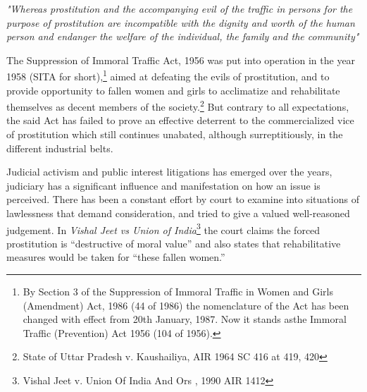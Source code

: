 \begin{multicols}{2}
\noi
\textit{"Whereas prostitution and the accompanying evil of the traffic in persons for the purpose of
prostitution are incompatible with the dignity and worth of the human person and endanger
the welfare of the individual, the family and the community"}

\noi
The Suppression of Immoral Traffic Act, 1956 was put into operation in the year 1958 (SITA
for short),\footnote{By Section 3 of the Suppression of Immoral Traffic in Women and Girls (Amendment) Act, 1986 (44 of 1986) the nomenclature of the Act has been changed with effect from 20th January, 1987. Now it stands asthe Immoral Traffic (Prevention) Act 1956 (104 of 1956).} aimed at defeating the evils of prostitution, and to provide opportunity to fallen
women and girls to acclimatize and rehabilitate themselves as decent members of the society.\footnote{State of Uttar Pradesh v. Kaushailiya, AIR 1964 SC 416 at 419, 420} But contrary to all expectations, the said Act has failed to prove an effective deterrent to the commercialized vice of prostitution which still continues unabated, although surreptitiously, in the different industrial belts.

\noi
Judicial activism and public interest litigations has emerged over the years, judiciary has a
significant influence and manifestation on how an issue is perceived. There has been a constant
effort by court to examine into situations of lawlessness that demand consideration, and tried to give a valued well-reasoned judgement. In \textit{Vishal Jeet vs Union of India}\footnote{Vishal Jeet v. Union Of India And Ors , 1990 AIR 1412} the court claims the forced prostitution is “destructive of moral value” and also states that rehabilitative measures would be taken for “these fallen women.”



\end{multicols}
